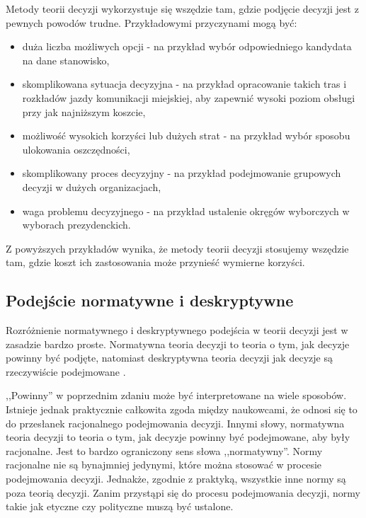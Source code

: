 Metody teorii decyzji wykorzystuje się wszędzie tam, gdzie podjęcie decyzji 
jest z pewnych powodów trudne. Przykładowymi przyczynami mogą być:
\begin{itemize}

  \item duża liczba możliwych opcji - na przykład wybór odpowiedniego kandydata 
  na dane stanowisko,
  
  \item skomplikowana sytuacja decyzyjna - na przykład opracowanie takich tras 
  i rozkładów jazdy komunikacji miejskiej, aby zapewnić wysoki poziom obsługi 
  przy jak najniższym koszcie,
  
  \item możliwość wysokich korzyści lub dużych strat - na przykład wybór 
  sposobu ulokowania oszczędności,
  
  \item skomplikowany proces decyzyjny - na przykład podejmowanie grupowych 
  decyzji w dużych organizacjach,
  
  \item waga problemu decyzyjnego - na przykład ustalenie okręgów wyborczych w 
  wyborach prezydenckich.

\end{itemize}

Z powyższych przykładów wynika, że metody teorii decyzji stosujemy wszędzie tam, 
gdzie koszt ich zastosowania może przynieść wymierne korzyści.

\subsection{Podejście normatywne i deskryptywne}
Rozróżnienie normatywnego i deskryptywnego podejścia w teorii decyzji jest w 
zasadzie bardzo proste. Normatywna teoria decyzji to teoria o tym, jak decyzje 
powinny być podjęte, natomiast deskryptywna teoria decyzji jak decyzje są 
rzeczywiście podejmowane \cite{Anand1995}.

,,Powinny'' w poprzednim zdaniu może być interpretowane na wiele sposobów.
Istnieje jednak praktycznie całkowita zgoda między naukowcami, że odnosi 
się to do przesłanek racjonalnego podejmowania decyzji. Innymi słowy, 
normatywna teoria decyzji to teoria o tym, jak decyzje powinny być podejmowane, 
aby były racjonalne. Jest to bardzo ograniczony sens słowa ,,normatywny''. Normy
racjonalne nie są bynajmniej jedynymi, które można stosować w procesie 
podejmowania decyzji. Jednakże, zgodnie z praktyką, wszystkie inne normy są 
poza teorią decyzji. Zanim przystąpi się do procesu podejmowania decyzji, normy
takie jak etyczne czy polityczne muszą być ustalone.

